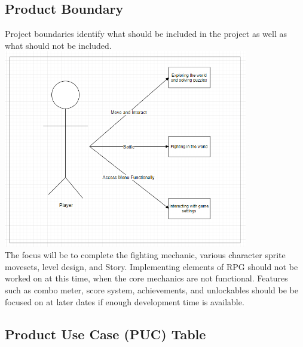 \documentclass{article}
\begin{document}
	\subsection{Product Boundary}
	Project boundaries identify what should be included in the project as well as what should not be included.\\

	\includegraphics[width=0.8\textwidth]{product-boundary.png} \\

	The focus will be to complete the fighting mechanic, various character sprite movesets, level design, and Story. Implementing elements of RPG should not be worked on at this time, when the core mechanics are not functional. Features such as combo meter, score system, achievements, and unlockables should be be focused on at later dates if enough development time is available.
	\subsection{Product Use Case (PUC) Table}
\end{document}
